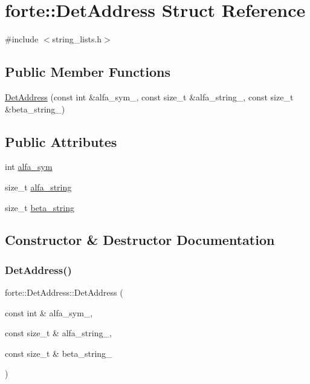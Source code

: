 \hypertarget{structforte_1_1_det_address}{}\section{forte\+:\+:Det\+Address Struct Reference}
\label{structforte_1_1_det_address}


{\ttfamily \#include $<$string\+\_\+lists.\+h$>$}

\subsection*{Public Member Functions}
\begin{DoxyCompactItemize}
\item 
\mbox{\hyperlink{structforte_1_1_det_address_af8a84f76d87a88af65e0e02034e419fe}{Det\+Address}} (const int \&alfa\+\_\+sym\+\_\+, const size\+\_\+t \&alfa\+\_\+string\+\_\+, const size\+\_\+t \&beta\+\_\+string\+\_\+)
\end{DoxyCompactItemize}
\subsection*{Public Attributes}
\begin{DoxyCompactItemize}
\item 
int \mbox{\hyperlink{structforte_1_1_det_address_ada2f2627ae7ac72cb9f26aefaff890ec}{alfa\+\_\+sym}}
\item 
size\+\_\+t \mbox{\hyperlink{structforte_1_1_det_address_a8db5a38e27778019003bbcf3fb58cf42}{alfa\+\_\+string}}
\item 
size\+\_\+t \mbox{\hyperlink{structforte_1_1_det_address_ab97641c82504a86bfffc10e60e55217b}{beta\+\_\+string}}
\end{DoxyCompactItemize}


\subsection{Constructor \& Destructor Documentation}
\mbox{\label{structforte_1_1_det_address_af8a84f76d87a88af65e0e02034e419fe}} 
\subsubsection{\texorpdfstring{Det\+Address()}{DetAddress()}}
{\footnotesize\ttfamily forte\+::\+Det\+Address\+::\+Det\+Address (\begin{DoxyParamCaption}\item[{const int \&}]{alfa\+\_\+sym\+\_\+,  }\item[{const size\+\_\+t \&}]{alfa\+\_\+string\+\_\+,  }\item[{const size\+\_\+t \&}]{beta\+\_\+string\+\_\+ }\end{DoxyParamCaption})\hspace{0.3cm}{\ttfamily [inline]}}



